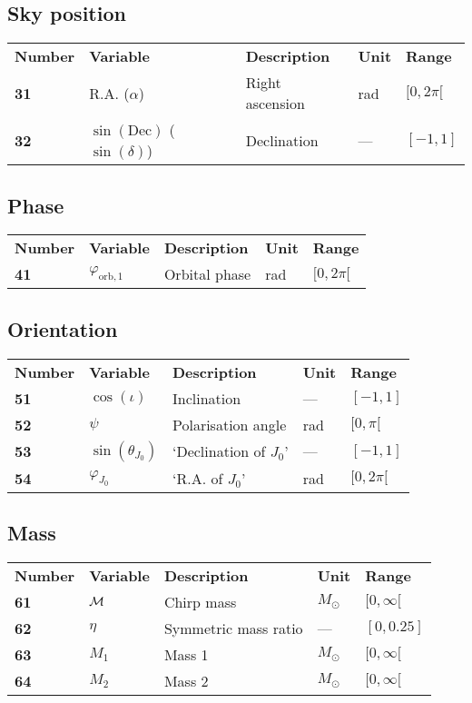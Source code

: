 \documentclass[10pt]{article}
\begin{document}
\subsection{Sky position}
\begin{tabular}{lllll}
  \textbf{Number} & \textbf{Variable} & \textbf{Description} & \textbf{Unit} & \textbf{Range} \\
  \textbf{31} & R.A. ($\alpha$)  & Right ascension & rad & $[0,2\pi[$ \\
  \textbf{32} & $\sin(\mathrm{Dec})$ ($\sin(\delta)$)  & Declination & --- & $[-1,1]$ \\
\end{tabular}


\subsection{Phase}
\begin{tabular}{lllll}
  \textbf{Number} & \textbf{Variable} & \textbf{Description} & \textbf{Unit} & \textbf{Range} \\
  \textbf{41} & $\varphi_\mathrm{orb,1}$  & Orbital phase & rad & $[0,2\pi[$ \\
\end{tabular}

\subsection{Orientation}
\begin{tabular}{lllll}
  \textbf{Number} & \textbf{Variable} & \textbf{Description} & \textbf{Unit} & \textbf{Range} \\
  \textbf{51} & $\cos(\iota)$  & Inclination & --- & $[-1,1]$ \\
  \textbf{52} & $\psi$  & Polarisation angle & rad & $[0,\pi[$ \\
  \textbf{53} & $\sin(\theta_{J_0})$ & `Declination of $J_0$' & --- & $[-1,1]$ \\
  \textbf{54} & $\varphi_{J_0}$  & `R.A. of $J_0$' & rad & $[0,2\pi[$ \\
\end{tabular}

\subsection{Mass}
\begin{tabular}{lllll}
  \textbf{Number} & \textbf{Variable} & \textbf{Description} & \textbf{Unit} & \textbf{Range} \\
  \textbf{61} & $\cal{M}$  & Chirp mass & $M_\odot$ & $[0,\infty[$ \\
  \textbf{62} & $\eta$  & Symmetric mass ratio & --- & $[0,0.25]$ \\
  \textbf{63} & $M_1$  & Mass 1 & $M_\odot$ & $[0,\infty[$ \\
  \textbf{64} & $M_2$  & Mass 2 & $M_\odot$ &  $[0,\infty[$ \\
\end{tabular}
\end{document}
